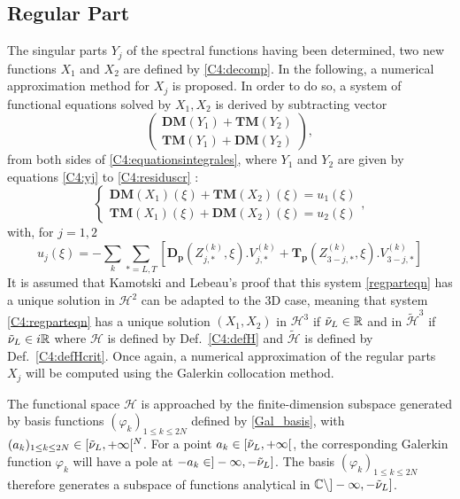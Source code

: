 \subsection{Regular Part}
\label{C4:regpart}
The singular parts $Y_j$ of the spectral functions having been determined, two new functions $X_1$ and $X_2$ are defined by \eqref{C4:decomp}. In the following, a numerical approximation method for $X_j$ is proposed. In order to do so, a system of functional equations solved by $X_1, X_2$ is derived by subtracting vector 
\begin{equation}
\begin{pmatrix}
\textbf{DM}(Y_1)+\textbf{TM}(Y_2) \\
\textbf{TM}(Y_1)+\textbf{DM}(Y_2)
\end{pmatrix},
\end{equation}
from both sides of \eqref{C4:equationsintegrales}, where $Y_1$ and $Y_2$ are given by equations \eqref{C4:yj} to \eqref{C4:residuscr} :
\begin{equation}
\left\{ 
\begin{matrix}
\mathbf{DM}(X_1)(\xi)+\textbf{TM}(X_2)(\xi)=u_1(\xi)\\
\textbf{TM}(X_1)(\xi)+\textbf{DM}(X_2)(\xi)=u_2(\xi)
\end{matrix}
\right.,
\label{C4:regparteqn}
\end{equation}
with, for $j=1,2$
\begin{equation}
u_j(\xi)=-\sum_k \sum_{*=L,T} \left[ \mathbf{D_p}(Z_{j,*}^{(k)},\xi).V_{j,*}^{(k)}+\mathbf{T_p}(Z_{3-j,*}^{(k)},\xi).V_{3-j,*}^{(k)}\right]
\label{C4:scndmembre}
\end{equation}
It is assumed that Kamotski and Lebeau's \cite{KamotskiLebeau} proof that this system \eqref{regparteqn} has a unique solution in $\mathcal{H}^2$ can be adapted to the 3D case, meaning that system \eqref{C4:regparteqn} has a unique solution $(X_1,X_2)$ in $\mathcal{H}^3$ if $\tilde{\nu}_L \in \mathbb{R}$ and in $\tilde{\mathcal{H}}^3$ if $\tilde{\nu}_L \in i\mathbb{R}$ where $\mathcal{H}$ is defined by Def.~\ref{C4:defH} and $\tilde{\mathcal{H}}$ is defined by Def.~\ref{C4:defHcrit}. Once again, a numerical approximation of the regular parts $X_j$ will be computed using the Galerkin collocation method. 

The functional space $\mathcal{H}$ is approached by the finite-dimension subspace generated by basis functions $(\varphi_k)_{1 \leq k \leq 2N}$ defined by \eqref{Gal_basis}, with $(a_k)_{1 \leq k \leq 2N} \in \lbrack \tilde{\nu}_L, + \infty \lbrack^N$. For a point $a_k \in \lbrack \tilde{\nu}_L, + \infty \lbrack$, the corresponding Galerkin function $\varphi_k$ will have a pole at $-a_k \in \rbrack-\infty,-\tilde{\nu}_L\rbrack$. The basis $(\varphi_k)_{1 \leq k \leq 2N}$ therefore generates a subspace of functions analytical in $\mathbb{C} \backslash  \rbrack-\infty,-\tilde{\nu}_L\rbrack$.%

